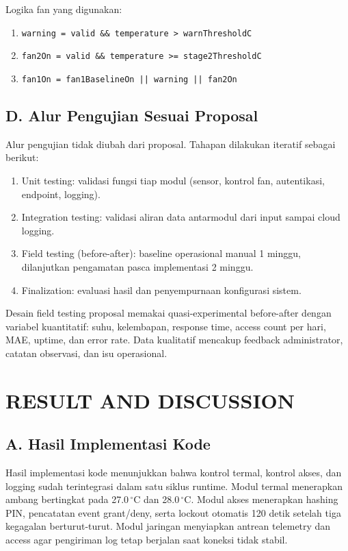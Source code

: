 \documentclass[10pt,a4paper,twocolumn]{article}
\begin{document}
Logika fan yang digunakan:
\begin{enumerate}[leftmargin=*,nosep]
\item \texttt{warning = valid \&\& temperature > warnThresholdC}
\item \texttt{fan2On = valid \&\& temperature >= stage2ThresholdC}
\item \texttt{fan1On = fan1BaselineOn || warning || fan2On}
\end{enumerate}

\subsection*{D. Alur Pengujian Sesuai Proposal}
Alur pengujian tidak diubah dari proposal. Tahapan dilakukan iteratif sebagai berikut:
\begin{enumerate}[leftmargin=*,nosep]
\item Unit testing: validasi fungsi tiap modul (sensor, kontrol fan, autentikasi, endpoint, logging).
\item Integration testing: validasi aliran data antarmodul dari input sampai cloud logging.
\item Field testing (before-after): baseline operasional manual 1 minggu, dilanjutkan pengamatan pasca implementasi 2 minggu.
\item Finalization: evaluasi hasil dan penyempurnaan konfigurasi sistem.
\end{enumerate}

Desain field testing proposal memakai quasi-experimental before-after dengan variabel kuantitatif: suhu, kelembapan, response time, access count per hari, MAE, uptime, dan error rate. Data kualitatif mencakup feedback administrator, catatan observasi, dan isu operasional.

\section{RESULT AND DISCUSSION}
\subsection*{A. Hasil Implementasi Kode}
Hasil implementasi kode menunjukkan bahwa kontrol termal, kontrol akses, dan logging sudah terintegrasi dalam satu siklus runtime. Modul termal menerapkan ambang bertingkat pada 27.0\,$^\circ$C dan 28.0\,$^\circ$C. Modul akses menerapkan hashing PIN, pencatatan event grant/deny, serta lockout otomatis 120 detik setelah tiga kegagalan berturut-turut. Modul jaringan menyiapkan antrean telemetry dan access agar pengiriman log tetap berjalan saat koneksi tidak stabil.
\end{document}

